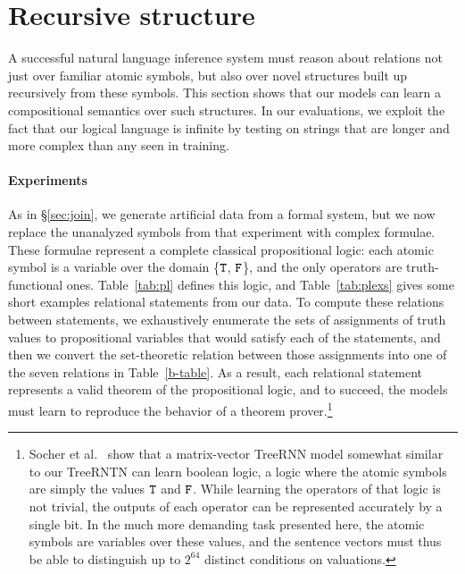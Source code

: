 \section{Recursive structure}\label{sec:recursion}

A successful natural language inference system must reason 
about relations not just over familiar
atomic symbols, but also over novel structures built up 
recursively from these symbols. 
This section shows that our models can learn a 
compositional semantics over such structures.
In our evaluations, we exploit the fact that our logical language
is infinite by testing on strings that are longer and more complex
than any seen in training.


\paragraph{Experiments}
As in \S\ref{sec:join}, we generate artificial data from a formal system,
 but we now replace the unanalyzed symbols
from that experiment with complex formulae. These formulae
represent a complete classical propositional logic:
each atomic symbol is a variable over the domain \{$\texttt{T}$, $\texttt{F}$\}, and the only
operators are truth-functional ones.  Table~\ref{tab:pl} defines this
logic, and Table~\ref{tab:plexs} gives some short examples relational statements from our data.
 To compute these relations
between statements, we exhaustively enumerate the sets of assignments
of truth values to propositional variables that would satisfy each of
the statements, and then we convert the set-theoretic relation between
those assignments into one of the seven relations in
Table~\ref{b-table}. As a result, each relational statement represents
a valid theorem of the propositional logic, and to succeed, the models 
must learn to reproduce the behavior of a theorem prover.\footnote{
Socher et al.~ show that a matrix-vector TreeRNN
model somewhat similar to our TreeRNTN can learn boolean logic, 
a logic where the atomic symbols are simply the
values $\texttt{T}$ and $\texttt{F}$. While learning the operators of that logic is not trivial, the outputs of
each operator can be represented accurately by a single bit.
In the much more demanding task presented here, the atomic symbols are variables over these values, and the sentence vectors must thus be able to distinguish up to $2^{64}$ distinct conditions on valuations.}

